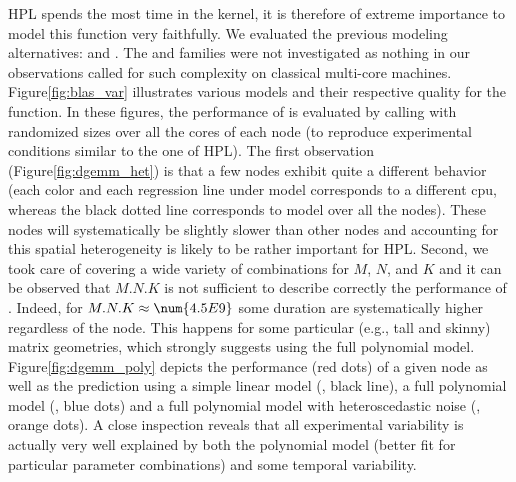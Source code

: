             HPL spends the most time in the \dgemm kernel, it is therefore of extreme importance to model this
            function very faithfully.  We  evaluated the previous modeling alternatives:
             and .  The \modelp{} and \noisep{}
            families were not investigated as nothing in our observations called for such complexity on classical
            multi-core machines.  Figure\ref{fig:blas_var} illustrates various models and their respective quality for
            the \dgemm function. In these figures, the performance of \dgemm is evaluated by calling
            \dgemm with randomized sizes over all the cores of each node (to reproduce experimental conditions
            similar to the one of HPL). The first observation (Figure\ref{fig:dgemm_het}) is that a few nodes exhibit
            quite a different behavior (each color and each regression line under model  corresponds to a
            different cpu, whereas the black dotted line corresponds to model  over all the nodes). These nodes
            will systematically be slightly slower than other nodes and accounting for this spatial heterogeneity is
            likely to be rather important for HPL.  Second, we took care of covering a wide variety of combinations for
            \(M\), \(N\), and \(K\) and it can be observed that \(M.N.K\) is not sufficient to describe correctly the
            performance of \dgemm. Indeed, for \(M.N.K \approx \num{4.5E9}\) some duration are systematically
            higher regardless of the node. This happens for some particular (e.g., tall and skinny) matrix geometries,
            which strongly suggests using the full polynomial model. Figure\ref{fig:dgemm_poly} depicts the performance
            (red dots) of a given node as well as the prediction using a simple linear model (, black line),
            a full polynomial model (, blue dots) and a full polynomial model with heteroscedastic noise
            (, orange dots). A close inspection reveals that all experimental variability is
            actually very well explained by both the polynomial model (better fit for particular parameter combinations)
            and some temporal variability.

